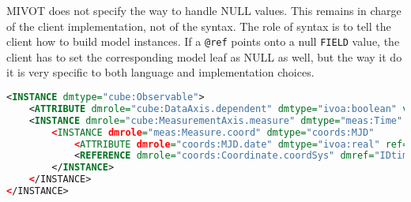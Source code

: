  MIVOT does not specify the way to handle NULL values. This remains in charge of the client implementation, 
 not of the syntax. The role of syntax is to tell the client how to build model instances. 
 If a \texttt{@ref} points onto a null \texttt{FIELD} value, the client has to set the corresponding model leaf 
 as NULL as well, but the way it do it is very specific to both language and implementation choices.
    
\begin{lstlisting}[caption={Example of an \texttt{ATTRIBUTE} set with either a column reference or a static value (see line~\ref{ATTRIBUTE_snippet} in Appendix~\ref{appendix_A}). If the column reference cannot be resolved, the attribute will be set with its static value.},language=XML]
<INSTANCE dmtype="cube:Observable">
    <ATTRIBUTE dmrole="cube:DataAxis.dependent" dmtype="ivoa:boolean" value="False"/>
    <INSTANCE dmrole="cube:MeasurementAxis.measure" dmtype="meas:Time"
        <INSTANCE dmrole="meas:Measure.coord" dmtype="coords:MJD"
            <ATTRIBUTE dmrole="coords:MJD.date" dmtype="ivoa:real" ref="IDobstime"/>
            <REFERENCE dmrole="coords:Coordinate.coordSys" dmref="IDtimesys"/>
        </INSTANCE>
    </INSTANCE>
</INSTANCE>
\end{lstlisting}  


